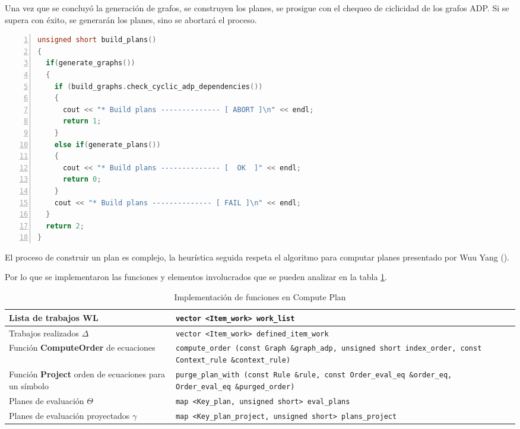 Una vez que se concluyó la generación de grafos, se construyen los planes, se prosigue con el chequeo de ciclicidad de los grafos ADP. Si se supera con éxito, se generarán los planes, sino se abortará el proceso.

\begin{lstlisting}[language=C++, basicstyle=\scriptsize, numbers=left, columns=fullflexible, linewidth=11cm]
unsigned short build_plans()
{
  if(generate_graphs())
  {
    if (build_graphs.check_cyclic_adp_dependencies())
    {
      cout << "* Build plans -------------- [ ABORT ]\n" << endl;
      return 1;
    }
    else if(generate_plans())
    {
      cout << "* Build plans -------------- [  OK  ]" << endl;
      return 0;
    }
    cout << "* Build plans -------------- [ FAIL ]\n" << endl;
  }
  return 2;
}
\end{lstlisting}
\vspace{0.3cm}

El proceso de construir un plan es complejo, la heurística seguida respeta el algoritmo para computar planes presentado por Wuu Yang (\cite{wuu-yang1}).

Por lo que se implementaron las funciones y elementos involucrados que se pueden analizar en la tabla \ref{table:map-comp-plan}.
\begin{table}[!ht]
\begin{tabular}{| p{4.5cm} | p{10.5cm} |}
\hline
Lista de trabajos \textbf{WL} & \texttt{vector <Item\_work>\ work\_list} \\ \hline

Trabajos realizados {\LARGE\textbf{$\Delta$}} & \texttt{vector <Item\_work>\ defined\_item\_work} \\ \hline

Función \textbf{ComputeOrder} de ecuaciones & \texttt{compute\_order (const Graph \&graph\_adp, unsigned short index\_order, const Context\_rule \&context\_rule)} \\ \hline

Función \textbf{Project} orden de ecuaciones para un símbolo & \texttt{purge\_plan\_with (const Rule \&rule, const Order\_eval\_eq \&order\_eq, Order\_eval\_eq \&purged\_order)} \\ \hline

Planes de evaluación {\LARGE\textbf{$\Theta$}} & \texttt{map <Key\_plan, unsigned short>\ eval\_plans} \\ \hline

Planes de evaluación \hspace{1cm}proyectados {\LARGE\textbf{$\gamma$}} & \texttt{map <Key\_plan\_project, unsigned short>\ plans\_project} \\
\hline
\end{tabular}
\caption{\label{table:map-comp-plan} Implementación de funciones en Compute Plan}
\end{table}

